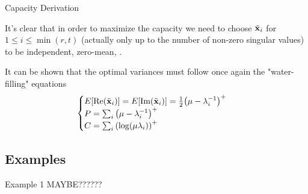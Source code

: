 \begin{frame}[allowframebreaks]{Capacity Derivation}
\framebreak

It's clear that in order to maximize the capacity we need to choose $\tilde{\vb{\vb{x}}}_i$ for $1\leq i \leq \min(r,t)$ (actually only up to the number of non-zero singular values) to be independent, zero-mean, \cscg.

\medskip
It can be shown that the optimal variances must follow once again the "water-filling" equations
\begin{equation*}
\begin{cases}
E\qty[\Re(\tilde{\vb{\vb{x}}}_i)] = E\qty[\Im(\tilde{\vb{\vb{x}}}_i)] = \frac{1}{2} \qty(\mu-\lambda_i^{-1})^+\\
P = \sum_i \qty(\mu-\lambda_i^{-1})^+\\
C = \sum_i \qty(\log(\mu\lambda_i))^+
\end{cases}
\end{equation*}

\end{frame}

\subsection{Examples}
\begin{frame}
\begin{example}{Example 1}
	MAYBE??????
\end{example}
\end{frame}

